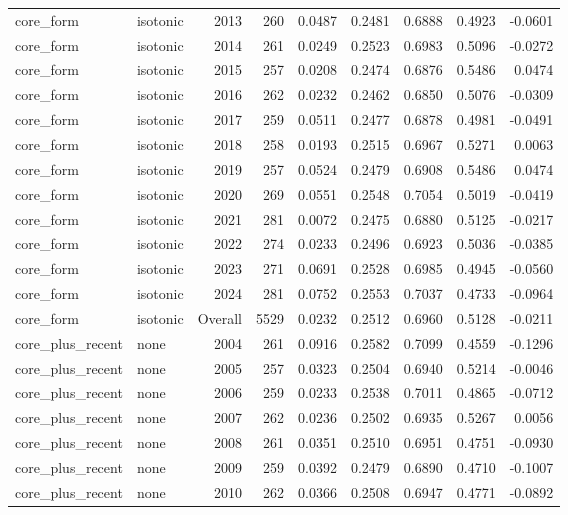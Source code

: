 \begin{table}[t]
\begin{tabular}{@{} l l r r r r r r r @{} }
      core\_form & isotonic & 2013 & 260 & 0.0487 & 0.2481 & 0.6888 & 0.4923 & -0.0601 \\
      core\_form & isotonic & 2014 & 261 & 0.0249 & 0.2523 & 0.6983 & 0.5096 & -0.0272 \\
      core\_form & isotonic & 2015 & 257 & 0.0208 & 0.2474 & 0.6876 & 0.5486 & 0.0474 \\
      core\_form & isotonic & 2016 & 262 & 0.0232 & 0.2462 & 0.6850 & 0.5076 & -0.0309 \\
      core\_form & isotonic & 2017 & 259 & 0.0511 & 0.2477 & 0.6878 & 0.4981 & -0.0491 \\
      core\_form & isotonic & 2018 & 258 & 0.0193 & 0.2515 & 0.6967 & 0.5271 & 0.0063 \\
      core\_form & isotonic & 2019 & 257 & 0.0524 & 0.2479 & 0.6908 & 0.5486 & 0.0474 \\
      core\_form & isotonic & 2020 & 269 & 0.0551 & 0.2548 & 0.7054 & 0.5019 & -0.0419 \\
      core\_form & isotonic & 2021 & 281 & 0.0072 & 0.2475 & 0.6880 & 0.5125 & -0.0217 \\
      core\_form & isotonic & 2022 & 274 & 0.0233 & 0.2496 & 0.6923 & 0.5036 & -0.0385 \\
      core\_form & isotonic & 2023 & 271 & 0.0691 & 0.2528 & 0.6985 & 0.4945 & -0.0560 \\
      core\_form & isotonic & 2024 & 281 & 0.0752 & 0.2553 & 0.7037 & 0.4733 & -0.0964 \\
      core\_form & isotonic & Overall & 5529 & 0.0232 & 0.2512 & 0.6960 & 0.5128 & -0.0211 \\
      core\_plus\_recent & none & 2004 & 261 & 0.0916 & 0.2582 & 0.7099 & 0.4559 & -0.1296 \\
      core\_plus\_recent & none & 2005 & 257 & 0.0323 & 0.2504 & 0.6940 & 0.5214 & -0.0046 \\
      core\_plus\_recent & none & 2006 & 259 & 0.0233 & 0.2538 & 0.7011 & 0.4865 & -0.0712 \\
      core\_plus\_recent & none & 2007 & 262 & 0.0236 & 0.2502 & 0.6935 & 0.5267 & 0.0056 \\
      core\_plus\_recent & none & 2008 & 261 & 0.0351 & 0.2510 & 0.6951 & 0.4751 & -0.0930 \\
      core\_plus\_recent & none & 2009 & 259 & 0.0392 & 0.2479 & 0.6890 & 0.4710 & -0.1007 \\
      core\_plus\_recent & none & 2010 & 262 & 0.0366 & 0.2508 & 0.6947 & 0.4771 & -0.0892 \\

\end{tabular}
\end{table}
